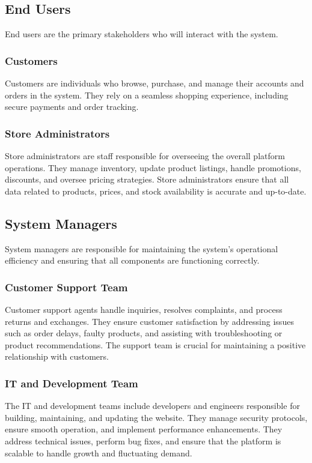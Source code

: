 \documentclass[a4paper,journal]{IEEEtran}
\begin{document}
\subsection{End Users}
End users are the primary stakeholders who will interact with the system.

\subsubsection{Customers}
Customers are individuals who browse, purchase, and manage their accounts and
orders in the system. They rely on a seamless shopping experience, including
secure payments and order tracking.

\subsubsection{Store Administrators}
Store administrators are staff responsible for overseeing the overall platform
operations. They manage inventory, update product listings, handle promotions,
discounts, and oversee pricing strategies. Store administrators ensure that all
data related to products, prices, and stock availability is accurate and
up-to-date.

\subsection{System Managers}
System managers are responsible for maintaining the system's operational
efficiency and ensuring that all components are functioning correctly.

\subsubsection{Customer Support Team}
Customer support agents handle inquiries, resolves complaints, and process
returns and exchanges.
They ensure customer satisfaction by addressing issues such as order delays,
faulty products, and assisting with troubleshooting or product recommendations. 
The support team is crucial for maintaining a positive relationship with
customers.

\subsubsection{IT and Development Team}
The IT and development teams include
developers and engineers responsible for building, maintaining, and updating the
website.
They manage security protocols, ensure smooth operation, and implement
performance enhancements. They address technical issues, perform bug fixes,
and ensure that the platform is scalable to handle growth and fluctuating
demand.
\end{document}
